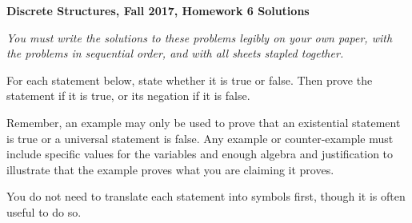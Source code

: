 \documentclass[12pt, letterpaper]{report}
\begin{document}
{\textbf{Discrete Structures, Fall 2017, Homework 6 Solutions}}

\medbreak

\textit{You must write the solutions to these problems legibly on your own paper, with
the problems in sequential order, and with all sheets stapled together.}

\bigskip

For each statement below, state whether it is true or false. Then prove the statement if it is true,
or its negation if it is false.\medskip

Remember, an example may only be used to prove that an existential statement is true or a universal
statement is false. Any example or counter-example must include specific values for the variables
and enough algebra and justification to illustrate that the example proves what you are claiming
it proves.\medskip

You do not need to translate each statement into symbols first, though it is often useful to do so.
\end{document}
